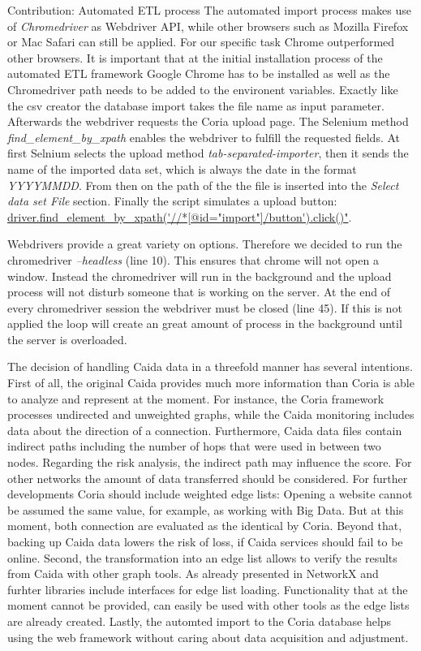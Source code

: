 \documentclass[conference, 11pt]{IEEEtran}
\begin{document}
\begin{subsection}{Contribution: Automated ETL process}
The automated import process makes use of \textit{Chromedriver} as Webdriver API, while other browsers such as Mozilla Firefox or Mac Safari can still be applied. For our specific task Chrome outperformed other browsers. It is important that at the initial installation process of the automated ETL framework Google Chrome has to be installed as well as the Chromedriver path needs to be added to the environent variables. Exactly like the csv creator the database import takes the file name as input parameter.
Afterwards the webdriver requests the Coria upload page. The Selenium method \textit{find\_element\_by\_xpath} enables the webdriver to fulfill the requested fields.
At first Selnium selects the upload method \textit{tab-separated-importer}, then it sends the name of the imported data set, which is always the date in the format \textit{YYYYMMDD}.
From then on the path of the the file is inserted into the \textit{Select data set File} section. 
Finally the script simulates a upload button: \url{driver.find_element_by_xpath('//*[@id="import"]/button').click()"}. \\ \linebreak

Webdrivers provide a great variety on options. Therefore we decided to run the chromedriver \textit{--headless} (line 10). This ensures that chrome will not open a window. Instead the chromedriver will run in the background and the upload process will not disturb someone that is working on the server. At the end of every chromedriver session the webdriver must be closed (line 45). If this is not applied the loop will create an great amount of process in the background until the server is overloaded.
\linebreak

The decision of handling Caida data in a threefold manner has several intentions. First of all, the original Caida provides much more information than Coria is able to analyze and represent at the moment. For instance, the Coria framework processes undirected and unweighted graphs, while the Caida monitoring includes data about the direction of a connection. Furthermore, Caida data files contain indirect paths including the number of hops that were used in between two nodes. Regarding the risk analysis, the indirect path may influence the score. For other networks the amount of data transferred should be considered. For further developments Coria should include weighted edge lists: Opening a website cannot be assumed the same value, for example, as working with Big Data. But at this moment, both connection are evaluated as the identical by Coria. Beyond that, backing up Caida data lowers the risk of loss, if Caida services should fail to be online.
Second, the transformation into an edge list allows to verify the results from Caida with other graph tools. As already presented in \cite{Coria3} NetworkX and furhter libraries include interfaces for edge list loading. Functionality that at the moment cannot be provided, can easily be used with other tools as the edge lists are already created.
Lastly, the automted import to the Coria database helps using the web framework without caring about data acquisition and adjustment. 



\end{subsection}
\end{document}
